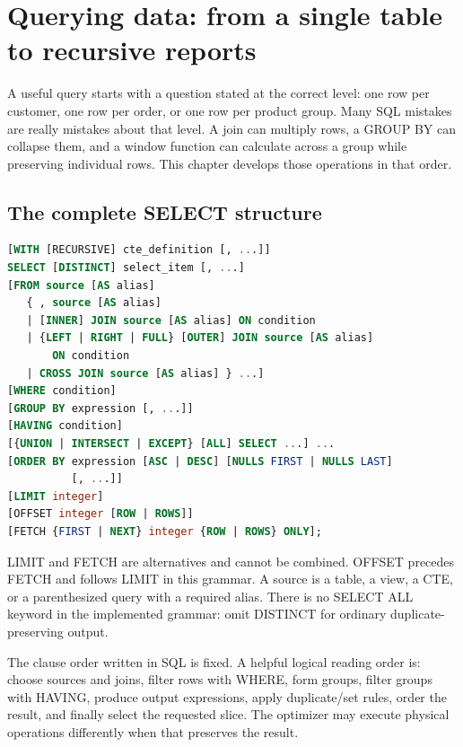 \chapter{Querying data: from a single table to recursive reports}
\label{sql:queries}

A useful query starts with a question stated at the correct level: one row per customer, one row per order, or one row per product group. Many SQL mistakes are really mistakes about that level. A join can multiply rows, a GROUP BY can collapse them, and a window function can calculate across a group while preserving individual rows. This chapter develops those operations in that order.

\section{The complete SELECT structure}

\begin{lstlisting}[language=SQL]
[WITH [RECURSIVE] cte_definition [, ...]]
SELECT [DISTINCT] select_item [, ...]
[FROM source [AS alias]
   { , source [AS alias]
   | [INNER] JOIN source [AS alias] ON condition
   | {LEFT | RIGHT | FULL} [OUTER] JOIN source [AS alias]
       ON condition
   | CROSS JOIN source [AS alias] } ...]
[WHERE condition]
[GROUP BY expression [, ...]]
[HAVING condition]
[{UNION | INTERSECT | EXCEPT} [ALL] SELECT ...] ...
[ORDER BY expression [ASC | DESC] [NULLS FIRST | NULLS LAST]
          [, ...]]
[LIMIT integer]
[OFFSET integer [ROW | ROWS]]
[FETCH {FIRST | NEXT} integer {ROW | ROWS} ONLY];
\end{lstlisting}

LIMIT and FETCH are alternatives and cannot be combined. OFFSET precedes FETCH and follows LIMIT in this grammar. A source is a table, a view, a CTE, or a parenthesized query with a required alias. There is no SELECT ALL keyword in the implemented grammar: omit DISTINCT for ordinary duplicate-preserving output.

The clause order written in SQL is fixed. A helpful logical reading order is: choose sources and joins, filter rows with WHERE, form groups, filter groups with HAVING, produce output expressions, apply duplicate/set rules, order the result, and finally select the requested slice. The optimizer may execute physical operations differently when that preserves the result.

